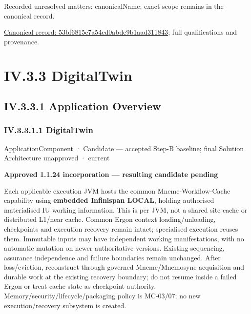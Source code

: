 {\small Recorded unresolved matters: canonicalName; exact scope remains in the canonical record.}\par
{\footnotesize \href{../../../../continuum/application/application-component/53bf6815c7a54ed0abde9b1aad311843.md}{Canonical record: 53bf6815c7a54ed0abde9b1aad311843}; full qualifications and provenance.}\par
\section*{IV.3.3 DigitalTwin}
\label{navigation:IV.3.3}

\subsection*{IV.3.3.1 Application Overview}
\label{navigation:IV.3.3.1}

\subsubsection*{IV.3.3.1.1 DigitalTwin}
\label{navigation:IV.3.3.1.1}

\label{element:3f64d339648246e99e8866c8089f8960}
{\small ApplicationComponent · Candidate — accepted Step-B baseline; final Solution Architecture unapproved · current}\par

\par\medskip\textbf{Approved 1.1.24 incorporation — resulting candidate pending}\par


Each applicable execution JVM hosts the common Mneme-Workflow-Cache capability using \textbf{embedded Infinispan LOCAL}, holding authorised materialised IU working information. This is per JVM, not a shared site cache or distributed L1/near cache. Common Ergon context loading/unloading, checkpoints and execution recovery remain intact; specialised execution reuses them. Immutable inputs may have independent working manifestations, with no automatic mutation on newer authoritative versions. Existing sequencing, assurance independence and failure boundaries remain unchanged. After loss/eviction, reconstruct through governed Mneme/Mnemosyne acquisition and durable work at the existing recovery boundary; do not resume inside a failed Ergon or treat cache state as checkpoint authority. Memory/security/lifecycle/packaging policy is MC-03/07; no new execution/recovery subsystem is created.



